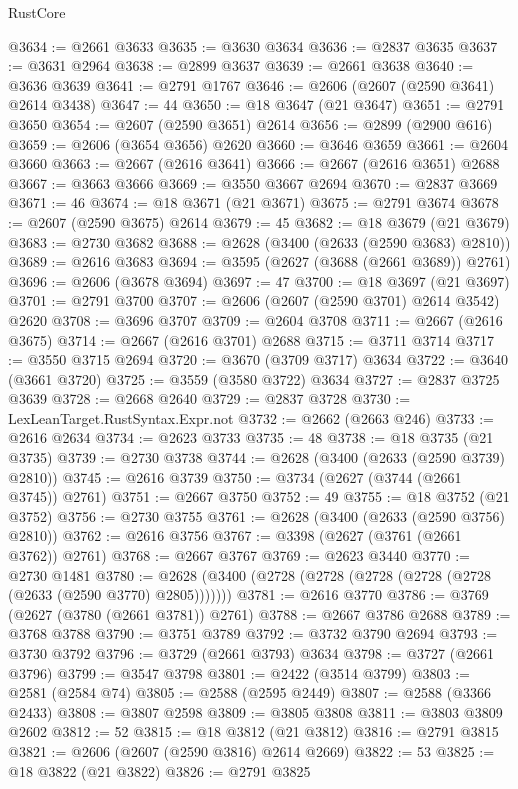 \begin{lexlean}{RustCore}
\begin{coremodule}
@3634 := @2661 @3633
@3635 := @3630 @3634
@3636 := @2837 @3635
@3637 := @3631 @2964
@3638 := @2899 @3637
@3639 := @2661 @3638
@3640 := @3636 @3639
@3641 := @2791 @1767
@3646 := @2606 (@2607 (@2590 @3641) @2614 @3438)
@3647 := 44
@3650 := @18 @3647 (@21 @3647)
@3651 := @2791 @3650
@3654 := @2607 (@2590 @3651) @2614
@3656 := @2899 (@2900 @616)
@3659 := @2606 (@3654 @3656) @2620
@3660 := @3646 @3659
@3661 := @2604 @3660
@3663 := @2667 (@2616 @3641)
@3666 := @2667 (@2616 @3651) @2688
@3667 := @3663 @3666
@3669 := @3550 @3667 @2694
@3670 := @2837 @3669
@3671 := 46
@3674 := @18 @3671 (@21 @3671)
@3675 := @2791 @3674
@3678 := @2607 (@2590 @3675) @2614
@3679 := 45
@3682 := @18 @3679 (@21 @3679)
@3683 := @2730 @3682
@3688 := @2628 (@3400 (@2633 (@2590 @3683) @2810))
@3689 := @2616 @3683
@3694 := @3595 (@2627 (@3688 (@2661 @3689)) @2761)
@3696 := @2606 (@3678 @3694)
@3697 := 47
@3700 := @18 @3697 (@21 @3697)
@3701 := @2791 @3700
@3707 := @2606 (@2607 (@2590 @3701) @2614 @3542) @2620
@3708 := @3696 @3707
@3709 := @2604 @3708
@3711 := @2667 (@2616 @3675)
@3714 := @2667 (@2616 @3701) @2688
@3715 := @3711 @3714
@3717 := @3550 @3715 @2694
@3720 := @3670 (@3709 @3717) @3634
@3722 := @3640 (@3661 @3720)
@3725 := @3559 (@3580 @3722) @3634
@3727 := @2837 @3725 @3639
@3728 := @2668 @2640
@3729 := @2837 @3728
@3730 := LexLeanTarget.RustSyntax.Expr.not
@3732 := @2662 (@2663 @246)
@3733 := @2616 @2634
@3734 := @2623 @3733
@3735 := 48
@3738 := @18 @3735 (@21 @3735)
@3739 := @2730 @3738
@3744 := @2628 (@3400 (@2633 (@2590 @3739) @2810))
@3745 := @2616 @3739
@3750 := @3734 (@2627 (@3744 (@2661 @3745)) @2761)
@3751 := @2667 @3750
@3752 := 49
@3755 := @18 @3752 (@21 @3752)
@3756 := @2730 @3755
@3761 := @2628 (@3400 (@2633 (@2590 @3756) @2810))
@3762 := @2616 @3756
@3767 := @3398 (@2627 (@3761 (@2661 @3762)) @2761)
@3768 := @2667 @3767
@3769 := @2623 @3440
@3770 := @2730 @1481
@3780 := @2628 (@3400 (@2728 (@2728 (@2728 (@2728 (@2728 (@2633 (@2590 @3770) @2805)))))))
@3781 := @2616 @3770
@3786 := @3769 (@2627 (@3780 (@2661 @3781)) @2761)
@3788 := @2667 @3786 @2688
@3789 := @3768 @3788
@3790 := @3751 @3789
@3792 := @3732 @3790 @2694
@3793 := @3730 @3792
@3796 := @3729 (@2661 @3793) @3634
@3798 := @3727 (@2661 @3796)
@3799 := @3547 @3798
@3801 := @2422 (@3514 @3799)
@3803 := @2581 (@2584 @74)
@3805 := @2588 (@2595 @2449)
@3807 := @2588 (@3366 @2433)
@3808 := @3807 @2598
@3809 := @3805 @3808
@3811 := @3803 @3809 @2602
@3812 := 52
@3815 := @18 @3812 (@21 @3812)
@3816 := @2791 @3815
@3821 := @2606 (@2607 (@2590 @3816) @2614 @2669)
@3822 := 53
@3825 := @18 @3822 (@21 @3822)
@3826 := @2791 @3825

\end{coremodule}
\end{lexlean}
